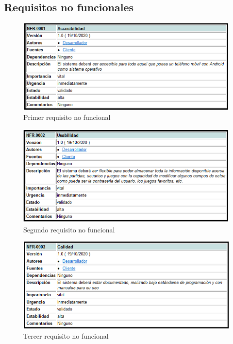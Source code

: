 \subsection{Requisitos no funcionales}

\begin{figure}[H]
    \centering
    \includegraphics[width=1\linewidth]{fig/Requisitos no funcionales/rnf1.png}
    \caption{Primer requisito no funcional}
    \label{fig:rnf1}
\end{figure}
\begin{figure}[H]
    \centering
    \includegraphics[width=1\linewidth]{fig/Requisitos no funcionales/rnf2.png}
    \caption{Segundo requisito no funcional}
    \label{fig:rnf2}
\end{figure}
\begin{figure}[H]
    \centering
    \includegraphics[width=1\linewidth]{fig/Requisitos no funcionales/rnf3.png}
    \caption{Tercer requisito no funcional}
    \label{fig:rnf3}
\end{figure}
